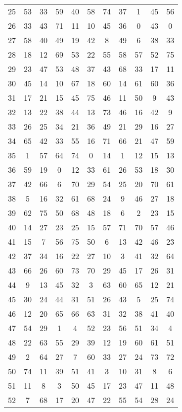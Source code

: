 \begin{table}
\begin{tabular}{c c c c c c c c c c c }
25 & 53 & 33 & 59 & 40 & 58 & 74 & 37 & 1 & 45 & 56 \\
26 & 33 & 43 & 71 & 11 & 10 & 45 & 36 & 0 & 43 & 0 \\
27 & 58 & 40 & 49 & 19 & 42 & 8 & 49 & 6 & 38 & 33 \\
28 & 18 & 12 & 69 & 53 & 22 & 55 & 58 & 57 & 52 & 75 \\
29 & 23 & 47 & 53 & 48 & 37 & 43 & 68 & 33 & 17 & 11 \\
30 & 45 & 14 & 10 & 67 & 18 & 60 & 14 & 61 & 60 & 36 \\
31 & 17 & 21 & 15 & 45 & 75 & 46 & 11 & 50 & 9 & 43 \\
32 & 13 & 22 & 38 & 44 & 13 & 73 & 46 & 16 & 42 & 9 \\
33 & 26 & 25 & 34 & 21 & 36 & 49 & 21 & 29 & 16 & 27 \\
34 & 65 & 42 & 33 & 55 & 16 & 71 & 66 & 21 & 47 & 59 \\
35 & 1 & 57 & 64 & 74 & 0 & 14 & 1 & 12 & 15 & 13 \\
36 & 59 & 19 & 0 & 12 & 33 & 61 & 26 & 53 & 18 & 30 \\
37 & 42 & 66 & 6 & 70 & 29 & 54 & 25 & 20 & 70 & 61 \\
38 & 5 & 16 & 32 & 61 & 68 & 24 & 9 & 46 & 27 & 18 \\
39 & 62 & 75 & 50 & 68 & 48 & 18 & 6 & 2 & 23 & 15 \\
40 & 14 & 27 & 23 & 25 & 15 & 57 & 71 & 70 & 57 & 46 \\
41 & 15 & 7 & 56 & 75 & 50 & 6 & 13 & 42 & 46 & 23 \\
42 & 37 & 34 & 16 & 22 & 27 & 10 & 3 & 41 & 32 & 64 \\
43 & 66 & 26 & 60 & 73 & 70 & 29 & 45 & 17 & 26 & 31 \\
44 & 9 & 13 & 45 & 32 & 3 & 63 & 60 & 65 & 12 & 21 \\
45 & 30 & 24 & 44 & 31 & 51 & 26 & 43 & 5 & 25 & 74 \\
46 & 12 & 20 & 65 & 66 & 63 & 31 & 32 & 38 & 41 & 40 \\
47 & 54 & 29 & 1 & 4 & 52 & 23 & 56 & 51 & 34 & 4 \\
48 & 22 & 63 & 55 & 29 & 39 & 12 & 19 & 60 & 61 & 51 \\
49 & 2 & 64 & 27 & 7 & 60 & 33 & 27 & 24 & 73 & 72 \\
50 & 74 & 11 & 39 & 51 & 41 & 3 & 10 & 31 & 8 & 6 \\
51 & 11 & 8 & 3 & 50 & 45 & 17 & 23 & 47 & 11 & 48 \\
52 & 7 & 68 & 17 & 20 & 47 & 22 & 55 & 54 & 28 & 24 \\

\end{tabular}
\end{table}
